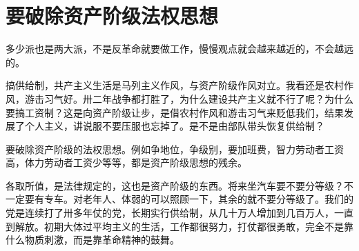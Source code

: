 \section[要破除资产阶级法权思想（一九六七年五月）]{要破除资产阶级法权思想}


多少派也是两大派，不是反革命就要做工作，慢慢观点就会越来越近的，不会越远的。

搞供给制，共产主义生活是马列主义作风，与资产阶级作风对立。我看还是农村作风，游击习气好。卅二年战争都打胜了，为什么建设共产主义就不行了呢？为什么要搞工资制？这是向资产阶级让步，是借农村作风和游击习气来贬低我们，结果发展了个人主义，讲说服不要压服也忘掉了。是不是由部队带头恢复供给制？

要破除资产阶级的法权思想。例如争地位，争级别，要加班费，智力劳动者工资高，体力劳动者工资少等等，都是资产阶级思想的残余。

各取所值，是法律规定的，这也是资产阶级的东西。将来坐汽车要不要分等级？不一定要有专车。对老年人、体弱的可以照顾一下，其余的就不要分等级了。我们的党是连续打了卅多年仗的党，长期实行供给制，从几十万人增加到几百万人，一直到解放。初期大体过平均主义的生活，工作都很努力，打仗都很勇敢，完全不是靠什么物质刺激，而是靠革命精神的鼓舞。


